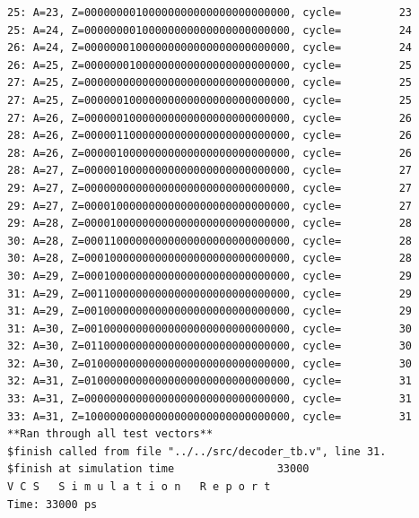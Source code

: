 \documentclass[11pt]{article}
\begin{document}
\begin{verbatim}
25: A=23, Z=00000000100000000000000000000000, cycle=         23
25: A=24, Z=00000000100000000000000000000000, cycle=         24
26: A=24, Z=00000001000000000000000000000000, cycle=         24
26: A=25, Z=00000001000000000000000000000000, cycle=         25
27: A=25, Z=00000000000000000000000000000000, cycle=         25
27: A=25, Z=00000010000000000000000000000000, cycle=         25
27: A=26, Z=00000010000000000000000000000000, cycle=         26
28: A=26, Z=00000110000000000000000000000000, cycle=         26
28: A=26, Z=00000100000000000000000000000000, cycle=         26
28: A=27, Z=00000100000000000000000000000000, cycle=         27
29: A=27, Z=00000000000000000000000000000000, cycle=         27
29: A=27, Z=00001000000000000000000000000000, cycle=         27
29: A=28, Z=00001000000000000000000000000000, cycle=         28
30: A=28, Z=00011000000000000000000000000000, cycle=         28
30: A=28, Z=00010000000000000000000000000000, cycle=         28
30: A=29, Z=00010000000000000000000000000000, cycle=         29
31: A=29, Z=00110000000000000000000000000000, cycle=         29
31: A=29, Z=00100000000000000000000000000000, cycle=         29
31: A=30, Z=00100000000000000000000000000000, cycle=         30
32: A=30, Z=01100000000000000000000000000000, cycle=         30
32: A=30, Z=01000000000000000000000000000000, cycle=         30
32: A=31, Z=01000000000000000000000000000000, cycle=         31
33: A=31, Z=00000000000000000000000000000000, cycle=         31
33: A=31, Z=10000000000000000000000000000000, cycle=         31
**Ran through all test vectors**
$finish called from file "../../src/decoder_tb.v", line 31.
$finish at simulation time                33000
V C S   S i m u l a t i o n   R e p o r t
Time: 33000 ps
\end{verbatim}
\end{document}
